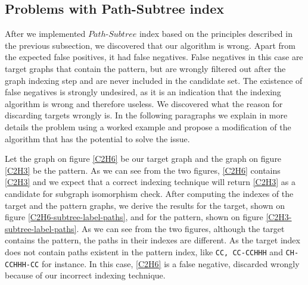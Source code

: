 \documentclass{l4proj}
\newcounter{example}[section]
\begin{document}
\subsection{Problems with Path-Subtree index}
\label{path-subtree index problems}
After we implemented $Path$-$Subtree$ index based on the principles described in the previous subsection, we discovered that our algorithm is wrong. Apart from the expected false positives, it had false negatives. False negatives in this case are target graphs that contain the pattern, but are wrongly filtered out after the graph indexing step and are never included in the candidate set. The existence of false negatives is strongly undesired, as it is an indication that the indexing algorithm is wrong and therefore useless. We discovered what the reason for discarding targets wrongly is. In the following paragraphs we explain in more details the problem using a worked example and propose a modification of the algorithm that has the potential to solve the issue.\par
Let the graph on figure \ref{C2H6} be our target graph and the graph on figure \ref{C2H3} be the pattern. As we can see from the two figures, \ref{C2H6} contains \ref{C2H3} and we expect that a correct indexing technique will return \ref{C2H3} as a candidate for subgraph isomorphism check. After computing the indexes of the target and the pattern graphs, we derive the results for the target, shown on figure \ref{C2H6-subtree-label-paths}, and for the pattern, shown on figure \ref{C2H3-subtree-label-paths}. As we can see from the two figures, although the target contains the pattern, the paths in their indexes are different. As the target index does not contain paths existent in the pattern index, like \texttt{CC, CC-CCHHH} and \texttt{CH-CCHHH-CC} for instance. In this case, \ref{C2H6} is a false negative, discarded wrongly because of our incorrect indexing technique.\par
\end{document}
